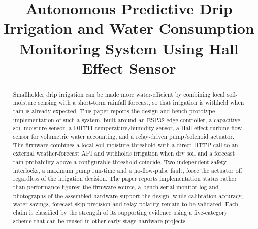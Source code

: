 \documentclass[conference]{IEEEtran}
\begin{document}
\title{Autonomous Predictive Drip Irrigation and Water Consumption\\
Monitoring System Using Hall Effect Sensor}

\author{
\and
{}
\and
{}
\and
{}
}

\maketitle

\begin{abstract}
Smallholder drip irrigation can be made more water-efficient by combining
local soil-moisture sensing with a short-term rainfall forecast, so that
irrigation is withheld when rain is already expected. This paper reports
the design and bench-prototype implementation of such a system, built
around an ESP32 edge controller, a capacitive soil-moisture sensor, a
DHT11 temperature/humidity sensor, a Hall-effect turbine flow sensor for
volumetric water accounting, and a relay-driven pump/solenoid actuator.
The firmware combines a local soil-moisture threshold with a direct
HTTP call to an external weather-forecast API and withholds irrigation
when dry soil and a forecast rain probability above a configurable
threshold coincide. Two independent safety interlocks, a maximum pump
run-time and a no-flow-pulse fault, force the actuator off regardless of
the irrigation decision. The paper reports implementation status rather
than performance figures: the firmware source, a bench serial-monitor
log and photographs of the assembled hardware support the design, while
calibration accuracy, water savings, forecast-skip precision and relay
polarity remain to be validated. Each claim is classified by the
strength of its supporting evidence using a five-category scheme that
can be reused in other early-stage hardware projects.
\end{abstract}
\end{document}
